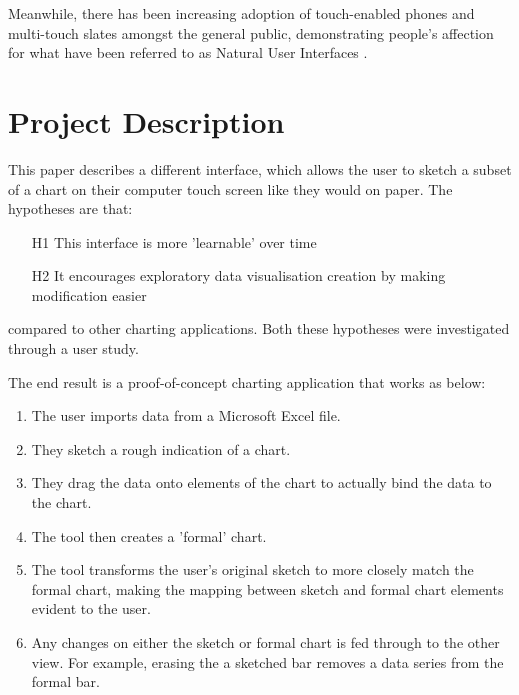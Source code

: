 Meanwhile, there has been increasing adoption of touch-enabled phones and multi-touch slates amongst the general public, demonstrating people's affection for what have been referred to as Natural User Interfaces \cite{Lee2012}.


\section{Project Description}
This paper describes a different interface, which allows the user to sketch a subset of a chart on their computer touch screen like they would on paper. The hypotheses are that:

\begin{enumerate}
\item[H1] This interface is more 'learnable' over time
\item[H2] It encourages exploratory data visualisation creation by making modification easier
\end{enumerate}

compared to other charting applications. Both these hypotheses were investigated through a user study.


The end result is a proof-of-concept charting application that works as below:
\begin{enumerate}
\item The user imports data from a Microsoft Excel file.
\item They sketch a rough indication of a chart.
\item They drag the data onto elements of the chart to actually bind the data to the chart. 
\item The tool then creates a 'formal' chart.
\item The tool transforms the user's original sketch to more closely match the formal chart, making the mapping between sketch and formal chart elements evident to the user.
\item Any changes on either the sketch or formal chart is fed through to the other view. For example, erasing the a sketched bar removes a data series from the formal bar.
\end{enumerate}

